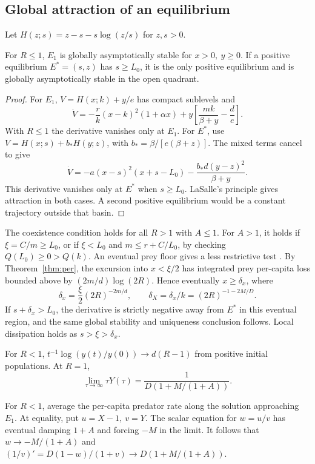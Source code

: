 \subsection{Global attraction of an equilibrium}
Let \(H(z;s)=z-s-s\log(z/s)\) for \(z,s>0\).
\begin{theorem}\label{thm:entropy}
For \(R\le1\), \(E_1\) is globally asymptotically stable for \(x>0,\ y\ge0\).
If a positive equilibrium \(E^*=(s,z)\) has \(s\ge L_0\), it is the only positive equilibrium and is globally asymptotically stable in the open quadrant.
\end{theorem}
\begin{proof}
For \(E_1\), \(V=H(x;k)+y/e\) has compact sublevels and
\[
 \dot V=-\frac{r}{k}(x-k)^2(1+\alpha x)
        +y\left[\frac{mk}{\beta+y}-\frac{d}{e}\right].
\]
With \(R\le1\) the derivative vanishes only at \(E_1\). For \(E^*\), use \(V=H(x;s)+b_*H(y;z)\), with \(b_*=\beta/[e(\beta+z)]\). The mixed terms cancel to give
\[
 \dot V=-a(x-s)^2(x+s-L_0)-\frac{b_*d(y-z)^2}{\beta+y}.
\]
This derivative vanishes only at \(E^*\) when \(s\ge L_0\). LaSalle's principle gives attraction in both cases. A second positive equilibrium would be a constant trajectory outside that basin.
\end{proof}
The coexistence condition holds for all \(R>1\) with \(A\le1\). For \(A>1\), it holds if \(\xi=C/m\ge L_0\), or if \(\xi<L_0\) and \(m\le r+C/L_0\), by checking \(Q(L_0)\ge0>Q(k)\). An eventual prey floor gives a less restrictive test \citep{taskfour}. By Theorem~\ref{thm:per}, the excursion into \(x<\xi/2\) has integrated prey per-capita loss bounded above by \((2m/d)\log(2R)\). Hence eventually \(x\ge\delta_x\), where
\begin{equation}\label{eq:floorentropy}
 \delta_x=\frac{\xi}{2}(2R)^{-2m/d},\qquad
 \delta_X=\delta_x/k=(2R)^{-1-2M/D}.
\end{equation}
If \(s+\delta_x>L_0\), the derivative is strictly negative away from \(E^*\) in this eventual region, and the same global stability and uniqueness conclusion follows. Local dissipation holds as \(s>\xi>\delta_x\).

\begin{corollary}\label{cor:rate}
For \(R<1\), \(t^{-1}\log(y(t)/y(0))\to d(R-1)\) from positive initial populations. At \(R=1\),
\[
 \lim_{\tau\to\infty}\tau Y(\tau)=\frac{1}{D(1+M/(1+A))}.
\]
\end{corollary}
For \(R<1\), average the per-capita predator rate along the solution approaching \(E_1\). At equality, put \(u=X-1,\ v=Y\). The scalar equation for \(w=u/v\) has eventual damping \(1+A\) and forcing \(-M\) in the limit. It follows that \(w\to-M/(1+A)\) and
\((1/v)'=D(1-w)/(1+v)\to D(1+M/(1+A))\).

